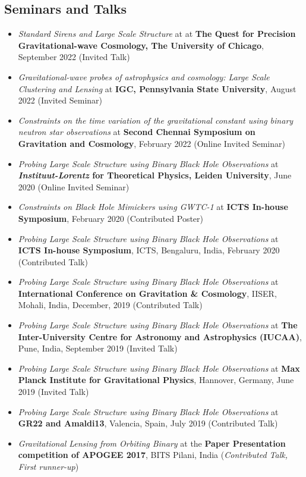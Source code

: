 \documentclass[11pt, margin, centered, letterpaper]{res}
\begin{document}
\begin{resume}
\section{Seminars and Talks}
\begin{itemize}[leftmargin=*]
    \item \textit{Standard Sirens and Large Scale Structure} at at \textbf{The Quest for Precision Gravitational-wave Cosmology, The University of Chicago}, September 2022 (Invited Talk)    \item \textit{Gravitational-wave probes of astrophysics and cosmology: Large Scale Clustering and Lensing} at \textbf{IGC, Pennsylvania State University}, August 2022 (Invited Seminar)
	 \item \textit{Constraints on the time variation of the gravitational constant using binary neutron star observations} at \textbf{Second Chennai Symposium on Gravitation and Cosmology}, February 2022 (Online Invited Seminar)
	 \item \textit{Probing Large Scale Structure using Binary Black Hole Observations} at \textbf{\textit{Instituut-Lorentz} for Theoretical Physics, Leiden University}, June 2020 (Online Invited Seminar)
	 \item \textit{Constraints on Black Hole Mimickers using GWTC-1} at \textbf{ICTS In-house Symposium}, February 2020 (Contributed Poster)
	 \item \textit{Probing Large Scale Structure using Binary Black Hole Observations} at \textbf{ICTS In-house Symposium}, ICTS, Bengaluru, India, February 2020 (Contributed Talk)
	 \item \textit{Probing Large Scale Structure using Binary Black Hole Observations} at \textbf{International Conference on Gravitation \& Cosmology}, IISER, Mohali, India, December, 2019 (Contributed Talk)
	 \item \textit{Probing Large Scale Structure using Binary Black Hole Observations} at \textbf{The Inter-University Centre for Astronomy and Astrophysics (IUCAA)}, Pune, India, September 2019 (Invited Talk)
	 \item \textit{Probing Large Scale Structure using Binary Black Hole Observations} at \textbf{Max Planck Institute for Gravitational Physics}, Hannover, Germany, June 2019 (Invited Talk)
	\item \textit{Probing Large Scale Structure using Binary Black Hole Observations} at \textbf{GR22 and Amaldi13}, Valencia, Spain, July 2019 (Contributed Talk)
	\item \textit{Gravitational Lensing from Orbiting Binary} at the \textbf{Paper Presentation competition of APOGEE 2017}, BITS Pilani, India (\textit{Contributed Talk, First runner-up})


\end{itemize}
\end{resume}
\end{document}
